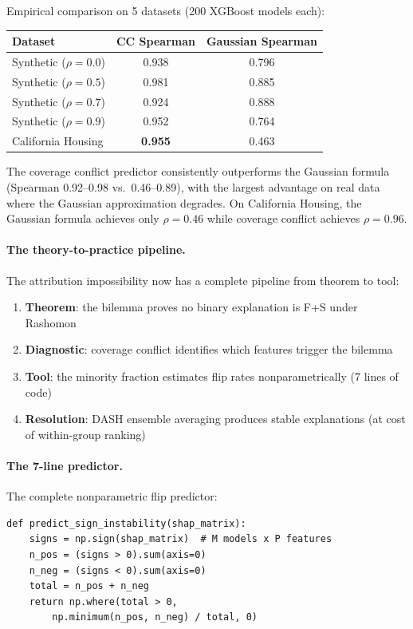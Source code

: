 \documentclass{article}
\begin{document}
Empirical comparison on 5 datasets (200 XGBoost models each):

\begin{center}
\small
\begin{tabular}{lcc}
\toprule
Dataset & CC Spearman & Gaussian Spearman \\
\midrule
Synthetic ($\rho = 0.0$) & 0.938 & 0.796 \\
Synthetic ($\rho = 0.5$) & 0.981 & 0.885 \\
Synthetic ($\rho = 0.7$) & 0.924 & 0.888 \\
Synthetic ($\rho = 0.9$) & 0.952 & 0.764 \\
California Housing & \textbf{0.955} & 0.463 \\
\bottomrule
\end{tabular}
\end{center}

The coverage conflict predictor consistently outperforms the Gaussian formula (Spearman 0.92--0.98 vs.\ 0.46--0.89), with the largest advantage on real data where the Gaussian approximation degrades. On California Housing, the Gaussian formula achieves only $\rho = 0.46$ while coverage conflict achieves $\rho = 0.96$.

\paragraph{The theory-to-practice pipeline.}
The attribution impossibility now has a complete pipeline from theorem to tool:
\begin{enumerate}
  \item \textbf{Theorem}: the bilemma proves no binary explanation is F+S under Rashomon
  \item \textbf{Diagnostic}: coverage conflict identifies which features trigger the bilemma
  \item \textbf{Tool}: the minority fraction estimates flip rates nonparametrically (7 lines of code)
  \item \textbf{Resolution}: DASH ensemble averaging produces stable explanations (at cost of within-group ranking)
\end{enumerate}

\paragraph{The 7-line predictor.}
The complete nonparametric flip predictor:

{\small
\begin{verbatim}
def predict_sign_instability(shap_matrix):
    signs = np.sign(shap_matrix)  # M models x P features
    n_pos = (signs > 0).sum(axis=0)
    n_neg = (signs < 0).sum(axis=0)
    total = n_pos + n_neg
    return np.where(total > 0,
        np.minimum(n_pos, n_neg) / total, 0)
\end{verbatim}
}
\end{document}
